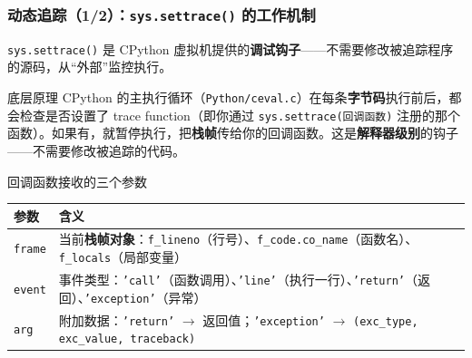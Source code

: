 \documentclass[presentation,aspectratio=169]{ctexbeamer}
\begin{document}
\begin{frame}
\frametitle{动态追踪（1/2）：\texttt{sys.settrace()} 的工作机制}
{\footnotesize \texttt{sys.settrace()} 是 CPython 虚拟机提供的\textbf{调试钩子}——不需要修改被追踪程序的源码，从``外部''监控执行。}

\vspace{0.1cm}
\begin{block}{\footnotesize 底层原理}
{\footnotesize CPython 的主执行循环（\texttt{Python/ceval.c}）在每条\textbf{字节码}执行前后，都会检查是否设置了 trace function（即你通过 \texttt{sys.settrace(回调函数)} 注册的那个函数）。如果有，就暂停执行，把\textbf{栈帧}传给你的回调函数。这是\textbf{解释器级别}的钩子——不需要修改被追踪的代码。}
\end{block}

\vspace{0.1cm}
\begin{block}{\footnotesize 回调函数接收的三个参数}
{\footnotesize
\begin{tabular}{lp{7.5cm}}
\toprule
\textbf{参数} & \textbf{含义} \\
\midrule
\texttt{frame} & 当前\textbf{栈帧对象}：\texttt{f\_lineno}（行号）、\texttt{f\_code.co\_name}（函数名）、\texttt{f\_locals}（局部变量） \\
\texttt{event} & 事件类型：\texttt{'call'}（函数调用）、\texttt{'line'}（执行一行）、\texttt{'return'}（返回）、\texttt{'exception'}（异常） \\
\texttt{arg} & 附加数据：\texttt{'return'} $\rightarrow$ 返回值；\texttt{'exception'} $\rightarrow$ \texttt{(exc\_type, exc\_value, traceback)} \\
\bottomrule
\end{tabular}}
\end{block}
\end{frame}

\end{document}
